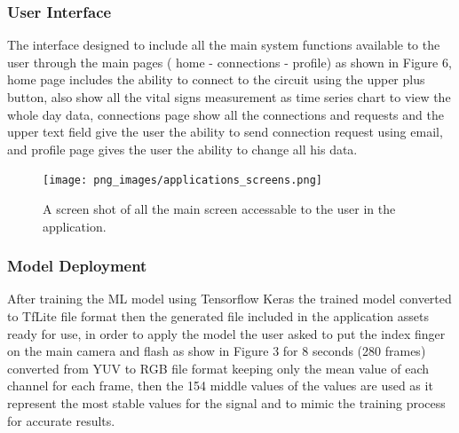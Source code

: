 \documentclass{bmcart}
\begin{document}
\subsubsection*{User Interface}
The interface designed to include all the main system functions available to the
user through the main pages ( home - connections - profile) as shown in Figure
6, home page includes the ability to connect to the circuit using the upper plus
button, also show all the vital signs measurement  as time series chart to view
the whole day  data, connections page show all the connections and requests and
the upper text field give the user the ability  to send connection request using
email, and profile page gives the user the ability to change all his data.
\begin{figure}[h!]
  \texttt{[image: png\_images/applications\_screens.png]}
  \caption{
  A screen shot of all the main screen accessable to the user in the
  application.}
\end{figure}
\FloatBarrier

\subsubsection*{Model Deployment}
After training the ML model using Tensorflow Keras the trained model converted
to TfLite file format then the generated file included in the application assets
ready for use, in order to apply the model the user asked to put the index
finger on the main camera and flash as show in Figure 3 for 8 seconds (280
frames) converted from YUV to RGB file format keeping only the mean value of
each channel for each frame, then the 154 middle values of the values are used
as it represent the most stable values for the signal and  to mimic the training
process for accurate results.
\end{document}
